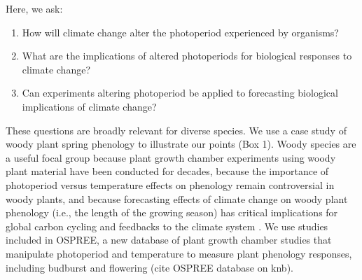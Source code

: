 \documentclass{article}
\begin{document}
\par Here, we ask: 
\begin{enumerate}
\item How will climate change alter the photoperiod experienced by organisms? %
\item What are the implications of altered photoperiods for biological responses to climate change?
\item Can experiments altering photoperiod be applied to forecasting biological implications of climate change?

\end{enumerate}
\par These questions are broadly relevant for diverse species. We use a case study of woody plant spring phenology to illustrate our points (Box 1). Woody species are a useful focal group because plant growth chamber experiments using woody plant material have been conducted for decades, because the importance of photoperiod versus temperature effects on phenology remain controversial in woody plants, and because forecasting effects of climate change on woody plant phenology (i.e., the length of the growing season) has critical implications for global carbon cycling and feedbacks to the climate system \citep{richardson2013}. We use studies included in OSPREE, a new database of plant growth chamber studies that manipulate photoperiod and temperature to measure plant phenology responses, including budburst and flowering (cite OSPREE database on knb).%
\end{document}
